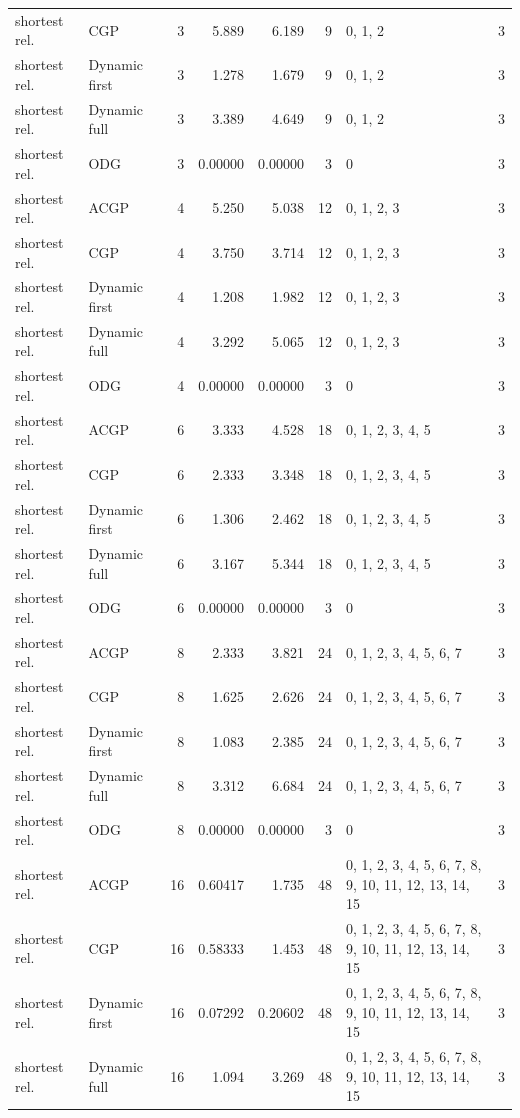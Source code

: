 \documentclass[10pt,a4paper]{article}
\begin{document}
\begin{longtable}{@{}p{23mm}p{29mm}rrrrp{36mm}r@{}}
shortest rel. & CGP & 3 & 5.889 & 6.189 & 9 & 0, 1, 2 & 3 \\
shortest rel. & Dynamic first & 3 & 1.278 & 1.679 & 9 & 0, 1, 2 & 3 \\
shortest rel. & Dynamic full & 3 & 3.389 & 4.649 & 9 & 0, 1, 2 & 3 \\
shortest rel. & ODG & 3 & 0.00000 & 0.00000 & 3 & 0 & 3 \\
shortest rel. & ACGP & 4 & 5.250 & 5.038 & 12 & 0, 1, 2, 3 & 3 \\
shortest rel. & CGP & 4 & 3.750 & 3.714 & 12 & 0, 1, 2, 3 & 3 \\
shortest rel. & Dynamic first & 4 & 1.208 & 1.982 & 12 & 0, 1, 2, 3 & 3 \\
shortest rel. & Dynamic full & 4 & 3.292 & 5.065 & 12 & 0, 1, 2, 3 & 3 \\
shortest rel. & ODG & 4 & 0.00000 & 0.00000 & 3 & 0 & 3 \\
shortest rel. & ACGP & 6 & 3.333 & 4.528 & 18 & 0, 1, 2, 3, 4, 5 & 3 \\
shortest rel. & CGP & 6 & 2.333 & 3.348 & 18 & 0, 1, 2, 3, 4, 5 & 3 \\
shortest rel. & Dynamic first & 6 & 1.306 & 2.462 & 18 & 0, 1, 2, 3, 4, 5 & 3 \\
shortest rel. & Dynamic full & 6 & 3.167 & 5.344 & 18 & 0, 1, 2, 3, 4, 5 & 3 \\
shortest rel. & ODG & 6 & 0.00000 & 0.00000 & 3 & 0 & 3 \\
shortest rel. & ACGP & 8 & 2.333 & 3.821 & 24 & 0, 1, 2, 3, 4, 5, 6, 7 & 3 \\
shortest rel. & CGP & 8 & 1.625 & 2.626 & 24 & 0, 1, 2, 3, 4, 5, 6, 7 & 3 \\
shortest rel. & Dynamic first & 8 & 1.083 & 2.385 & 24 & 0, 1, 2, 3, 4, 5, 6, 7 & 3 \\
shortest rel. & Dynamic full & 8 & 3.312 & 6.684 & 24 & 0, 1, 2, 3, 4, 5, 6, 7 & 3 \\
shortest rel. & ODG & 8 & 0.00000 & 0.00000 & 3 & 0 & 3 \\
shortest rel. & ACGP & 16 & 0.60417 & 1.735 & 48 & 0, 1, 2, 3, 4, 5, 6, 7, 8, 9, 10, 11, 12, 13, 14, 15 & 3 \\
shortest rel. & CGP & 16 & 0.58333 & 1.453 & 48 & 0, 1, 2, 3, 4, 5, 6, 7, 8, 9, 10, 11, 12, 13, 14, 15 & 3 \\
shortest rel. & Dynamic first & 16 & 0.07292 & 0.20602 & 48 & 0, 1, 2, 3, 4, 5, 6, 7, 8, 9, 10, 11, 12, 13, 14, 15 & 3 \\
shortest rel. & Dynamic full & 16 & 1.094 & 3.269 & 48 & 0, 1, 2, 3, 4, 5, 6, 7, 8, 9, 10, 11, 12, 13, 14, 15 & 3 \\

\end{longtable}
\end{document}
